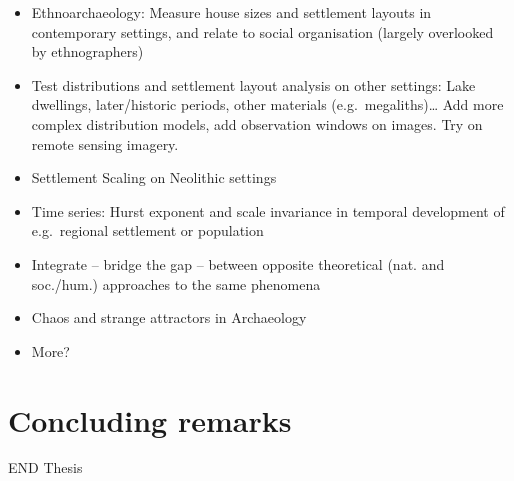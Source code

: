 \documentclass[
  12pt,
]{book}
\providecommand{\tightlist}{%
  \setlength{\itemsep}{0pt}\setlength{\parskip}{0pt}}
\begin{document}
\begin{itemize}
\tightlist
\item
  Ethnoarchaeology: Measure house sizes and settlement layouts in contemporary settings, and relate to social organisation (largely overlooked by ethnographers)
\item
  Test distributions and settlement layout analysis on other settings: Lake dwellings, later/historic periods, other materials (e.g.~megaliths)\ldots{} Add more complex distribution models, add observation windows on images. Try on remote sensing imagery.
\item
  Settlement Scaling on Neolithic settings
\item
  Time series: Hurst exponent and scale invariance in temporal development of e.g.~regional settlement or population
\item
  Integrate -- bridge the gap -- between opposite theoretical (nat. and soc./hum.) approaches to the same phenomena
\item
  Chaos and strange attractors in Archaeology
\item
  More?
\end{itemize}

\hypertarget{concluding-remarks}{%
\section{Concluding remarks}\label{concluding-remarks}}

END Thesis
\end{document}
